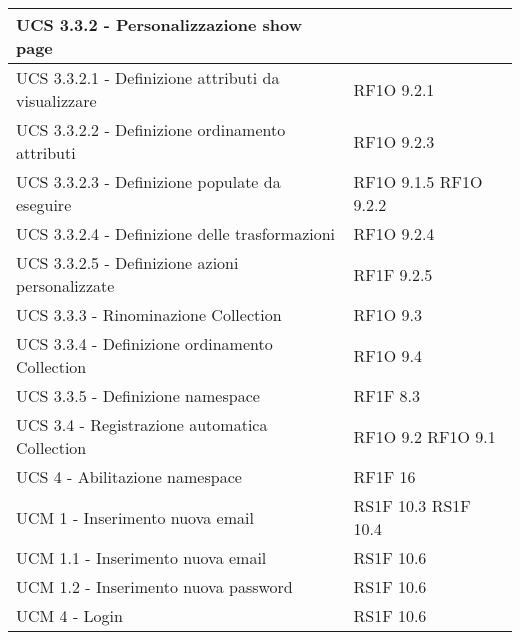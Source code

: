 \begin{center}
\begin{longtable}{ | p{5cm} | p{5cm} |}
            UCS 3.3.2 - Personalizzazione show page &  \\ \hline      
            UCS 3.3.2.1 -  Definizione attributi da visualizzare &  RF1O 9.2.1 \newline  \\ \hline      
            UCS 3.3.2.2 - Definizione ordinamento attributi &  RF1O 9.2.3 \newline  \\ \hline      
            UCS 3.3.2.3 - Definizione populate da eseguire &  RF1O 9.1.5 \newline  RF1O 9.2.2 \newline  \\ \hline      
            UCS 3.3.2.4 - Definizione delle trasformazioni &  RF1O 9.2.4 \newline  \\ \hline      
            UCS 3.3.2.5 - Definizione azioni personalizzate &  RF1F 9.2.5 \newline  \\ \hline      
            UCS 3.3.3  - Rinominazione Collection &  RF1O 9.3 \newline  \\ \hline      
            UCS 3.3.4  - Definizione ordinamento Collection &  RF1O 9.4 \newline  \\ \hline      
            UCS 3.3.5 - Definizione namespace &  RF1F 8.3 \newline  \\ \hline      
            UCS 3.4  - Registrazione automatica Collection &  RF1O 9.2 \newline  RF1O 9.1 \newline  \\ \hline      
            UCS 4 - Abilitazione namespace &  RF1F 16 \newline  \\ \hline      
            UCM 1 -  Inserimento nuova email &  RS1F 10.3 \newline  RS1F 10.4 \newline  \\ \hline      
            UCM 1.1 -  Inserimento nuova email &  RS1F 10.6 \newline  \\ \hline      
            UCM 1.2 - Inserimento nuova password &  RS1F 10.6 \newline  \\ \hline      
            UCM 4 - Login &  RS1F 10.6 \newline  \\ \hline      

\end{longtable}
\end{center}
